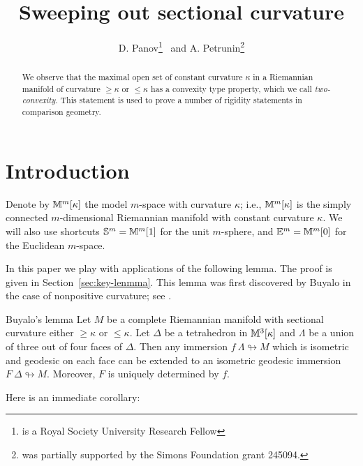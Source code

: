 \documentclass[oneside,a4paper]{article}
\begin{document}
\title{Sweeping out sectional curvature}
\author{D. Panov\thanks{is a Royal Society University Research Fellow}
\ and A. Petrunin\thanks{was partially supported by the
Simons Foundation grant 245094.}}
\date{}

\maketitle

\begin{abstract}
We observe that the maximal open set of constant curvature $\kappa$
in a Riemannian manifold of curvature $\ge\kappa$ or $\le \kappa$
has a convexity type property, which we call \emph{two-convexity}.
This statement is used to prove a number of rigidity statements in
comparison geometry.
\end{abstract}

\maketitle

\section{Introduction}

Denote by $\mathbb{M}^m[\kappa]$ the model $m$-space with curvature $\kappa$;
i.e., $\mathbb{M}^m[\kappa]$ is the simply connected $m$-dimensional Riemannian manifold with constant curvature $\kappa$.
We will also use shortcuts $\mathbb S^m=\mathbb{M}^m[1]$ for the unit $m$-sphere,
and $\mathbb{E}^m=\mathbb{M}^m[0]$ for the Euclidean $m$-space.

In this paper we play with applications of the following lemma.
The proof is given in Section~\ref{sec:key-lenmma}.
This lemma was first discovered by Buyalo
in the case of nonpositive curvature;
see \cite[Lemma 5.8]{buyalo}.

\begin{thm}{Buyalo's lemma}\label{lem:key}
Let $M$ be a complete Riemannian manifold with sectional curvature either $\ge \kappa$ or $\le \kappa$.
Let $\Delta$ be a tetrahedron in $\mathbb{M}^3[\kappa]$
and $\Lambda$ be a union of three out of four faces of $\Delta$.
Then any immersion $f\:\Lambda\looparrowright M$ which is isometric and geodesic on each face
can be extended to an isometric  geodesic immersion $F\:\Delta\looparrowright M$.
Moreover, $F$ is uniquely determined by $f$.
\end{thm}

Here is an immediate corollary:
\end{document}
